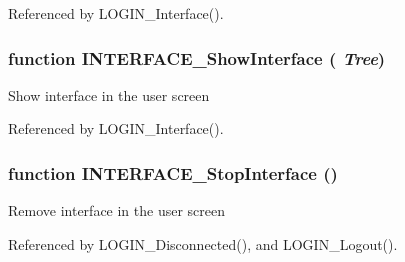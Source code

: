 Referenced by LOGIN\_\-Interface().
\subsubsection{\setlength{\rightskip}{0pt plus 5cm}function INTERFACE\_\-ShowInterface ( {\em Tree})}\label{interface_8js_e3cc5b666e93acdd2f85cee061a5ed65}


Show interface in the user screen 

Referenced by LOGIN\_\-Interface().
\subsubsection{\setlength{\rightskip}{0pt plus 5cm}function INTERFACE\_\-StopInterface ()}\label{interface_8js_9140670d04ba65dc1eeba2dd11979e04}


Remove interface in the user screen 

Referenced by LOGIN\_\-Disconnected(), and LOGIN\_\-Logout().